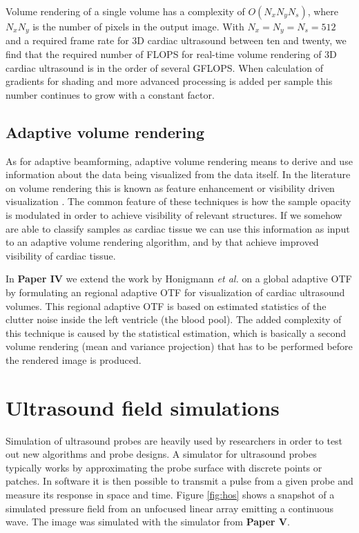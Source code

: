 Volume rendering of a single volume has a complexity of $O(N_xN_yN_s)$, where $N_xN_y$ is the number of pixels in the output image. With $N_x = N_y = N_s = 512$ and a required frame rate for 3D cardiac ultrasound between ten and twenty, we find that the required number of FLOPS for real-time volume rendering of 3D cardiac ultrasound is in the order of several GFLOPS. When calculation of gradients for shading and more advanced processing is added per sample this number continues to grow with a constant factor.

\subsection{Adaptive volume rendering}
As for adaptive beamforming, adaptive volume rendering means to derive and use information about the data being visualized from the data itself. In the literature on volume rendering this is known as feature enhancement or visibility driven visualization \cite{viola2005, correa2010visibility, marchesin2010}. The common feature of these techniques is how the sample opacity is modulated in order to achieve visibility of relevant structures. If we somehow are able to classify samples as cardiac tissue we can use this information as input to an adaptive volume rendering algorithm, and by that achieve improved visibility of cardiac tissue.

In \textbf{Paper IV} we extend the work by Honigmann \textit{et al.} \cite{Honigmann2003} on a global adaptive OTF by formulating an regional adaptive OTF for visualization of cardiac ultrasound volumes. This regional adaptive OTF is based on estimated statistics of the clutter noise inside the left ventricle (the blood pool). The added complexity of this technique is caused by the statistical estimation, which is basically a second volume rendering (mean and variance projection) that has to be performed before the rendered image is produced.

\section{Ultrasound field simulations}\label{sec:field}
Simulation of ultrasound probes are heavily used by researchers in order to test out new algorithms and probe designs. A simulator for ultrasound probes typically works by approximating the probe surface with discrete points or patches. In software it is then possible to transmit a pulse from a given probe and measure its response in space and time. Figure \ref{fig:hos} shows a snapshot of a simulated pressure field from an unfocused linear array emitting a continuous wave. The image was simulated with the simulator from \textbf{Paper V}. 

